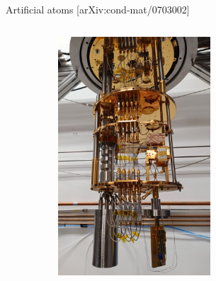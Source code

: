 \documentclass[aspectratio=169,10pt]{beamer}
\begin{document}
\begin{frame}{Artificial atoms \hfill{\small[arXiv:cond-mat/0703002]}}
\begin{columns}
\begin{column}{0.6\textwidth}
\begin{figure}
      \end{figure}
    \end{column}
    \begin{column}{0.6\textwidth}
      \centering
      \includegraphics[width=0.5\textwidth]{figures/cryostat.png}
    \end{column}
  \end{columns}
\end{frame}
\end{document}
